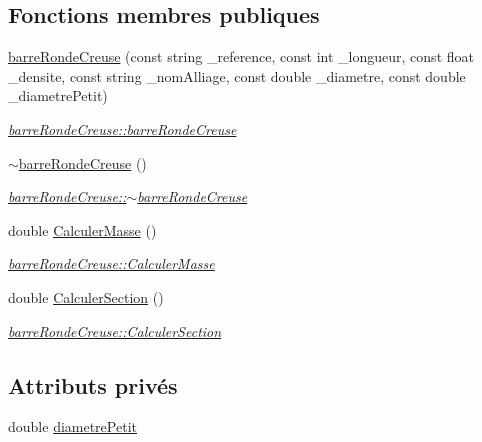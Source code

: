 \subsection*{Fonctions membres publiques}
\begin{DoxyCompactItemize}
\item 
\hyperlink{classbarre_ronde_creuse_aa3b1bff9d23a8f5740f082684aec2956}{barre\+Ronde\+Creuse} (const string \+\_\+reference, const int \+\_\+longueur, const float \+\_\+densite, const string \+\_\+nom\+Alliage, const double \+\_\+diametre, const double \+\_\+diametre\+Petit)
\begin{DoxyCompactList}\small\item\em \hyperlink{classbarre_ronde_creuse_aa3b1bff9d23a8f5740f082684aec2956}{barre\+Ronde\+Creuse\+::barre\+Ronde\+Creuse} \end{DoxyCompactList}\item 
\hyperlink{classbarre_ronde_creuse_aec4dfe7298ca1b2885e7f090fbb94954}{$\sim$barre\+Ronde\+Creuse} ()
\begin{DoxyCompactList}\small\item\em \hyperlink{classbarre_ronde_creuse_aec4dfe7298ca1b2885e7f090fbb94954}{barre\+Ronde\+Creuse\+::$\sim$barre\+Ronde\+Creuse} \end{DoxyCompactList}\item 
double \hyperlink{classbarre_ronde_creuse_a5c6242830085be53d968cb23602ea2b1}{Calculer\+Masse} ()
\begin{DoxyCompactList}\small\item\em \hyperlink{classbarre_ronde_creuse_a5c6242830085be53d968cb23602ea2b1}{barre\+Ronde\+Creuse\+::\+Calculer\+Masse} \end{DoxyCompactList}\item 
double \hyperlink{classbarre_ronde_creuse_adbd7d165624ef3580e7c85cd777cd95f}{Calculer\+Section} ()
\begin{DoxyCompactList}\small\item\em \hyperlink{classbarre_ronde_creuse_adbd7d165624ef3580e7c85cd777cd95f}{barre\+Ronde\+Creuse\+::\+Calculer\+Section} \end{DoxyCompactList}\end{DoxyCompactItemize}
\subsection*{Attributs privés}
\begin{DoxyCompactItemize}
\item 
double \hyperlink{classbarre_ronde_creuse_a78869588e151b3b0e3b1938eb8ebd0a0}{diametre\+Petit}
\end{DoxyCompactItemize}
